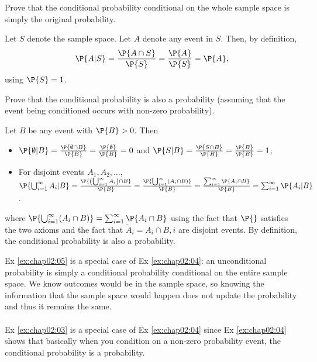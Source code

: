 	\begin{exercise}\label{ex:chap02:05}
		Prove that the conditional probability conditional on the whole sample space is simply the original probability. 
		\begin{solution}
			Let $S$ denote the sample space. Let $A$ denote any event in $S$. Then, by definition,
			\begin{equation*}
				\P{A|S} = \frac{\P{A \cap S}}{\P{S}} = \frac{\P{A}}{\P{S}} = \P{A},
			\end{equation*}
			using $\P{S} = 1$.
		\end{solution}
	\end{exercise}
	
	\begin{exercise}\label{ex:chap02:04}
		Prove that the conditional probability is also a probability (assuming that the event being conditioned occurs with non-zero probability).
		\begin{solution}
			Let $B$ be any event with $\P{B} > 0$. Then
			\begin{itemize}
				\item $\P{\emptyset | B} = \frac{\P{\emptyset \cap B}}{\P{B}} = \frac{\P{\emptyset}}{\P{B}} = 0$ and $\P{S | B} = \frac{\P{S \cap B}}{\P{B}} = \frac{\P{B}}{\P{B}} = 1$;
				\item For disjoint events $A_1, A_2, \hdots$, $\P{\bigcup_{i = 1}^{\infty} A_i | B} = \frac{\P{\left(\bigcup_{i = 1}^{\infty} A_i\right) \cap B}}{\P{B}} = \frac{\P{\bigcup_{i = 1}^{\infty} (A_i \cap B)}}{\P{B}} = \frac{\sum_{i = 1}^{\infty} \P{A_i \cap B}}{\P{B}} = \sum_{i = 1}^{\infty} \P{A_i | B}$.	
			\end{itemize}
		where $\P{\bigcup_{i = 1}^{\infty} (A_i \cap B)} = \sum_{i = 1}^{\infty} \P{A_i \cap B}$ using the fact that $\P{}$ satisfies the two axioms and the fact that $\widetilde{A}_i=A_i \cap B, i$ are disjoint events. 
			By definition, the conditional probability is also a probability.
		\end{solution}
	\end{exercise}
	
	\begin{remark}
		Ex \ref{ex:chap02:05} is a special case of Ex \ref{ex:chap02:04}: an unconditional probability is simply a conditional probability conditional on the entire sample space. We know outcomes would be in the sample space, so knowing the information that the sample space would happen does not update the probability and thus it remains the same.\\~\\
				Ex \ref{ex:chap02:03} is a special case of Ex \ref{ex:chap02:04} since Ex \ref{ex:chap02:04} shows that basically when you condition on a non-zero probability event, the conditional probability is a probability.
	\end{remark}

